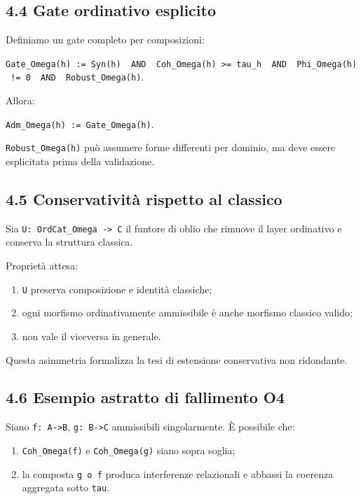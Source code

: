 \subsection{4.4 Gate ordinativo esplicito}

Definiamo un gate completo per composizioni:

\texttt{Gate\_Omega(h)\ :=\ Syn(h)\ \ AND\ \ Coh\_Omega(h)\ \textgreater{}=\ tau\_h\ \ AND\ \ Phi\_Omega(h)\ !=\ 0\ \ AND\ \ Robust\_Omega(h)}.

Allora:

\texttt{Adm\_Omega(h)\ :=\ Gate\_Omega(h)}.

\texttt{Robust\_Omega(h)} può assumere forme differenti per dominio, ma deve essere esplicitata prima della validazione.

\subsection{4.5 Conservatività rispetto al classico}

Sia \texttt{U:\ OrdCat\_Omega\ -\textgreater{}\ C} il funtore di oblio che rimuove il layer ordinativo e conserva la struttura classica.

Proprietà attesa:

\begin{enumerate}
\def\labelenumi{\arabic{enumi}.}
\tightlist
\item
  \texttt{U} preserva composizione e identità classiche;
\item
  ogni morfismo ordinativamente ammissibile è anche morfismo classico valido;
\item
  non vale il viceversa in generale.
\end{enumerate}

Questa asimmetria formalizza la tesi di estensione conservativa non ridondante.

\subsection{4.6 Esempio astratto di fallimento O4}

Siano \texttt{f:\ A-\textgreater{}B}, \texttt{g:\ B-\textgreater{}C} ammissibili singolarmente. È possibile che:

\begin{enumerate}
\def\labelenumi{\arabic{enumi}.}
\tightlist
\item
  \texttt{Coh\_Omega(f)} e \texttt{Coh\_Omega(g)} siano sopra soglia;
\item
  la composta \texttt{g\ o\ f} produca interferenze relazionali e abbassi la coerenza aggregata sotto \texttt{tau}.
\end{enumerate}

